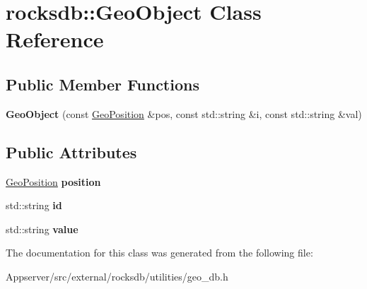 \hypertarget{classrocksdb_1_1GeoObject}{}\section{rocksdb\+:\+:Geo\+Object Class Reference}
\label{classrocksdb_1_1GeoObject}
\subsection*{Public Member Functions}
\begin{DoxyCompactItemize}
\item 
{\bfseries Geo\+Object} (const \hyperlink{classrocksdb_1_1GeoPosition}{Geo\+Position} \&pos, const std\+::string \&i, const std\+::string \&val)\hypertarget{classrocksdb_1_1GeoObject_a10df8c4ffca7b8bec3270202971f24fd}{}\label{classrocksdb_1_1GeoObject_a10df8c4ffca7b8bec3270202971f24fd}

\end{DoxyCompactItemize}
\subsection*{Public Attributes}
\begin{DoxyCompactItemize}
\item 
\hyperlink{classrocksdb_1_1GeoPosition}{Geo\+Position} {\bfseries position}\hypertarget{classrocksdb_1_1GeoObject_ad7a5bf0890a88078c0b78bb4f705e444}{}\label{classrocksdb_1_1GeoObject_ad7a5bf0890a88078c0b78bb4f705e444}

\item 
std\+::string {\bfseries id}\hypertarget{classrocksdb_1_1GeoObject_a0569d6274ab98445ef6ddc6222349003}{}\label{classrocksdb_1_1GeoObject_a0569d6274ab98445ef6ddc6222349003}

\item 
std\+::string {\bfseries value}\hypertarget{classrocksdb_1_1GeoObject_aadb5ce54d4e1e23e9649a32e695bd6f2}{}\label{classrocksdb_1_1GeoObject_aadb5ce54d4e1e23e9649a32e695bd6f2}

\end{DoxyCompactItemize}


The documentation for this class was generated from the following file\+:\begin{DoxyCompactItemize}
\item 
Appserver/src/external/rocksdb/utilities/geo\+\_\+db.\+h\end{DoxyCompactItemize}
